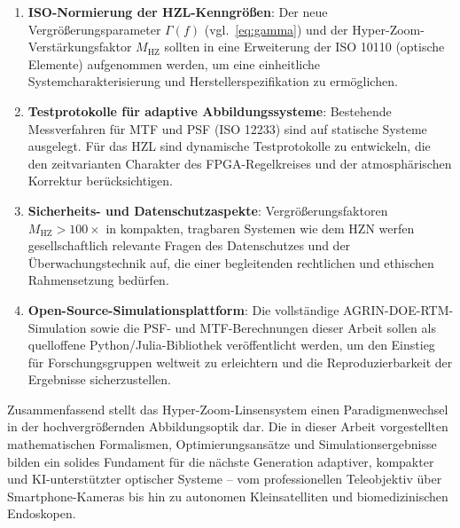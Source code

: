 ﻿\documentclass[12pt,a4paper]{article}
\theoremstyle{definition}
\newcommand{\HZ}{\mathrm{HZ}}
\begin{document}
	\begin{enumerate}[label=\arabic*.]
		\item \textbf{ISO-Normierung der HZL-Kenngrößen}: Der neue
		Vergrößerungsparameter $\Gamma(f)$ (vgl.\ \eqref{eq:gamma}) und
		der Hyper-Zoom-Verstärkungsfaktor $M_\HZ$ sollten in eine
		Erweiterung der ISO 10110 (optische Elemente) aufgenommen werden,
		um eine einheitliche Systemcharakterisierung und Herstellerspezifikation
		zu ermöglichen.
		\item \textbf{Testprotokolle für adaptive Abbildungssysteme}:
		Bestehende Messverfahren für MTF und PSF (ISO 12233) sind auf statische
		Systeme ausgelegt.  Für das HZL sind dynamische Testprotokolle
		zu entwickeln, die den zeitvarianten Charakter des FPGA-Regelkreises
		und der atmosphärischen Korrektur berücksichtigen.
		\item \textbf{Sicherheits- und Datenschutzaspekte}: Vergrößerungsfaktoren
		$M_\HZ > 100\times$ in kompakten, tragbaren Systemen wie dem HZN
		werfen gesellschaftlich relevante Fragen des Datenschutzes und
		der Überwachungstechnik auf, die einer begleitenden rechtlichen und
		ethischen Rahmensetzung bedürfen.
		\item \textbf{Open-Source-Simulationsplattform}: Die vollständige
		AGRIN-DOE-RTM-Simulation sowie die PSF- und MTF-Berechnungen
		dieser Arbeit sollen als quelloffene Python/Julia-Bibliothek
		veröffentlicht werden, um den Einstieg für Forschungsgruppen
		weltweit zu erleichtern und die Reproduzierbarkeit der Ergebnisse
		sicherzustellen.
	\end{enumerate}

	Zusammenfassend stellt das Hyper-Zoom-Linsensystem einen
	Paradigmenwechsel in der hochvergrößernden Abbildungsoptik dar.
	Die in dieser Arbeit vorgestellten mathematischen Formalismen,
	Optimierungsansätze und Simulationsergebnisse bilden ein solides
	Fundament für die nächste Generation adaptiver, kompakter und
	KI-unterstützter optischer Systeme -- vom professionellen
	Teleobjektiv über Smartphone-Kameras bis hin zu autonomen
	Kleinsatelliten und biomedizinischen Endoskopen.
	
\end{document}
